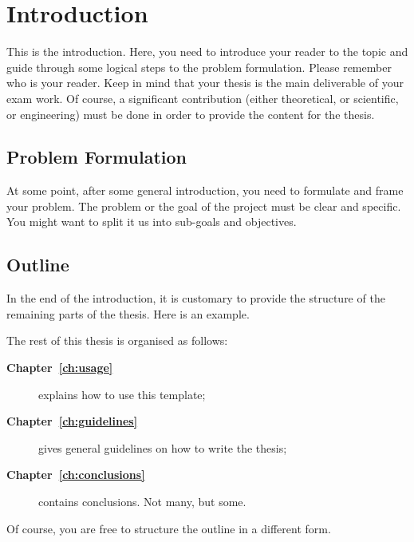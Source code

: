 \chapter{Introduction}
\label{ch:intro}

This is the introduction. Here, you need to introduce your reader to the topic and guide through some logical steps to the problem formulation. Please remember who is your reader. Keep in mind that your thesis is the main deliverable of your exam work. Of course, a significant contribution (either theoretical, or scientific, or engineering) must be done in order to provide the content for the thesis. 
\section{Problem Formulation}
\label{sec:problem}

At some point, after some general introduction, you need to formulate and frame your problem. 
The problem or the goal of the project must be clear and specific. You might want to split it us into sub-goals and objectives.

\section{Outline}
\label{sec:outline}

In the end of the introduction, it is customary to provide the structure of the remaining parts of the thesis. Here is an example.

The rest of this thesis is organised as follows:

\begin{description}

  \item[\textbf{Chapter~\ref{ch:usage}}] explains how to use this template;

  \item[\textbf{Chapter~\ref{ch:guidelines}}] gives general guidelines on how to write the thesis;

  \item[\textbf{Chapter~\ref{ch:conclusions}}] contains conclusions.  Not many,
  but some.

\end{description}

Of course, you are free to structure the outline in a different form.
